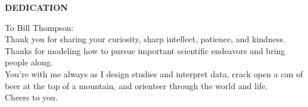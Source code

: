 
\clearpage

\normalsize
\begin{center}
{\textbf{DEDICATION}}
\hspace{0pt}

To Bill Thompson: \\
Thank you for sharing your curiosity, sharp intellect, patience, and kindness. \\
Thanks for modeling how to pursue important scientific endeavors and bring people along. \\ 
You're with me always as I design studies and interpret data, crack open a can of beer at the top of a mountain, and orienteer through the world and life. \\
Cheers to you. 

\begin{comment}
To the wild women in my life \\
who got off the speeding train \\ 
to nowhere \\
and are dancing on the platform and \\
throughout the grove -- \\
you know who you are. 
\vfill


\raggedright{i stand} \\
\raggedright{on the sacrifices} \\
\raggedright{of a million women before me} \\
\raggedright{thinking} \\
\raggedright{\textit{what can i do}} \\
\raggedright{\textit{to make this mountain taller}} \\
\raggedright{\textit{so the women after me}} \\
\raggedright{\textit{can see farther}} \\
\raggedright{\textit{- legacy}} \\
\raggedright{Rupi Kaur}

\vfill
\raggedright{There is a special place in hell for women who don't help other women.} \\
\raggedright{Madeleine Albright}
\vfill
\hspace{0pt}
\end{comment}

\end{center}

